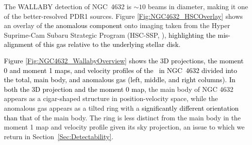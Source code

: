 \documentclass[fleqn,usenatbib]{mnras}
\newcommand{\hi}{\text{H\,\sc{i}}}
\newcommand{\KS}[1]{\textcolor{black}{#1}}
\begin{document}
  

The WALLABY detection of NGC~4632 is $\sim10$ beams in diameter, making it one of the better-resolved PDR1 sources. Figure \ref{Fig:NGC4632_HSCOverlay} shows an overlay of  \KS{the anomalous component} onto imaging taken from the Hyper Suprime-Cam Subaru Strategic Program (HSC-SSP, \citealt{Aihara2018}), \textcolor{black}{highlighting the mis-alignment of this gas relative to the underlying stellar disk}. 

\textcolor{black}{Figure \ref{Fig:NGC4632_WallabyOverview} shows the 3D projections, the moment 0 and moment 1 maps, and velocity profiles \KS{of the \hi\ in NGC~4632} divided into the total, main body, and anomalous gas (left, middle, and right columns).  }
\textcolor{black}{In both the 3D projection and the moment 0 map,} the main body of NGC 4632 appears as a cigar-shaped structure in position-velocity space, while the anomalous gas appears as a tilted ring with a \textcolor{black}{significantly different orientation than that} of the main body.  
The ring is less distinct from the main body in the moment 1 map and velocity profile given its sky projection, an issue to which we return in Section~\ref{Sec:Detectability}. 
\end{document}
